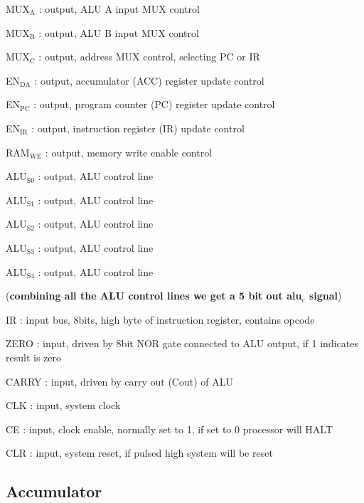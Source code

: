 \documentclass[11pt]{article}
\begin{document}
MUX\(_{\text{A}}\) : output, ALU A input MUX control

MUX\(_{\text{B}}\) : output, ALU B input MUX control 

MUX\(_{\text{C}}\) : output, address MUX control, selecting PC or IR 

EN\(_{\text{DA}}\) : output, accumulator (ACC) register update control 

EN\(_{\text{PC}}\) : output, program counter (PC) register update control 

EN\(_{\text{IR}}\) : output, instruction register (IR) update control 

RAM\(_{\text{WE}}\) : output, memory write enable control 

ALU\(_{\text{S0}}\) : output, ALU control line 

ALU\(_{\text{S1}}\) : output, ALU control line

ALU\(_{\text{S2}}\) : output, ALU control line 

ALU\(_{\text{S3}}\) : output, ALU control line 

ALU\(_{\text{S4}}\) : output, ALU control line

(\textbf{combining all the ALU control lines we get a 5 bit out alu\(_{\text{c}}\) signal}) 

IR : input bus, 8bits, high byte of instruction register, contains opcode 

ZERO : input, driven by 8bit NOR gate connected to ALU output, if 1 indicates result is zero 

CARRY : input, driven by carry out (Cout) of ALU 

CLK : input, system clock 

CE : input, clock enable, normally set to 1, if set to 0 processor will HALT 

CLR : input, system reset, if pulsed high system will be reset 

\subsection{Accumulator}
\label{sec:org7d58a19}
\end{document}
